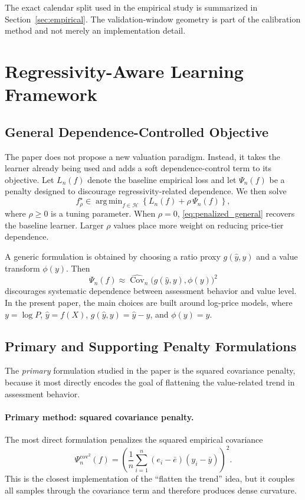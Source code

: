 \documentclass[12pt]{article}
\theoremstyle{plain}
\theoremstyle{definition}
\newcommand{\Cov}{\operatorname{Cov}}
\newcommand{\argmin}{\mathop{\mathrm{arg\,min}}}
\begin{document}
The exact calendar split used in the empirical study is summarized in Section~\ref{sec:empirical}. The validation-window geometry is part of the calibration method and not merely an implementation detail. \todo{}

\section{Regressivity-Aware Learning Framework}
\label{sec:framework}

\subsection{General Dependence-Controlled Objective}

The paper does not propose a new valuation paradigm. Instead, it takes the learner already being used and adds a soft dependence-control term to its objective. Let \(L_n(f)\) denote the baseline empirical loss and let \(\Psi_n(f)\) be a penalty designed to discourage regressivity-related dependence. We then solve
\begin{equation}
\label{eq:penalized_general}
f^\star_\rho
\in
\argmin_{f\in\mathcal H}
\left\{
L_n(f)+\rho\,\Psi_n(f)
\right\},
\end{equation}
where \(\rho\ge 0\) is a tuning parameter. When \(\rho=0\), \eqref{eq:penalized_general} recovers the baseline learner. Larger \(\rho\) values place more weight on reducing price-tier dependence.

A generic formulation is obtained by choosing a ratio proxy \(g(\hat y,y)\) and a value transform \(\phi(y)\). Then
\[
\Psi_n(f)
\approx
\widehat{\Cov}_n\!\bigl(g(\hat y,y),\phi(y)\bigr)^2
\]
discourages systematic dependence between assessment behavior and value level. In the present paper, the main choices are built around log-price models, where \(y=\log P\), \(\hat y=f(X)\), \(g(\hat y,y)=\hat y-y\), and \(\phi(y)=y\).

\subsection{Primary and Supporting Penalty Formulations}

The \emph{primary} formulation studied in the paper is the squared covariance penalty, because it most directly encodes the goal of flattening the value-related trend in assessment behavior.

\paragraph{Primary method: squared covariance penalty.}
The most direct formulation penalizes the squared empirical covariance
\begin{equation}
\label{eq:cov_penalty}
\Psi_n^{\mathrm{cov}^2}(f)
=
\left(
\frac{1}{n}\sum_{i=1}^n
(e_i-\bar e)(y_i-\bar y)
\right)^2.
\end{equation}
This is the closest implementation of the ``flatten the trend'' idea, but it couples all samples through the covariance term and therefore produces dense curvature.
\end{document}
